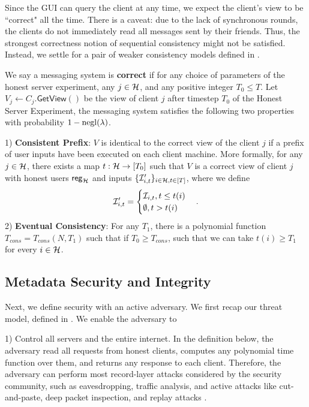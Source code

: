 Since the GUI can query the client at any time, we expect the client's view to be ``correct" all the time. There is a caveat: due to the lack of synchronous rounds, the clients do not immediately read all messages sent by their friends. Thus, the strongest correctness notion of sequential consistency might not be satisfied. Instead, we settle for a pair of weaker consistency models defined in \cite{doug13Consistency}. 
\begin{definition}
\label{defn:messaging-correctness}
 We say a messaging system is \textbf{correct} if for any choice of parameters of the honest server experiment, any $j \in \mathcal{H}$, and any positive integer $T_0 \leq T$. Let $V_j \leftarrow C_j.\mathsf{GetView}()$ be the view of client $j$ after timestep $T_0$ of the Honest Server Experiment, the messaging system satisfies the following two properties with probability $1 - \operatorname{negl}(\lambda)$.

1) \textbf{Consistent Prefix}: $V$ is identical to the correct view of the client $j$ if a prefix of user inputs have been executed on each client machine. More formally, for any $j \in \mathcal{H}$, there exists a map $t: \mathcal{H} \to [T_0]$ such that  $V$ is a correct view of client $j$ with honest users $\mathsf{reg}_{\mathcal{H}}$ and inputs $\{\mathcal{I}'_{i, t}\}_{i \in \mathcal{H}, t \in [T]}$, where we define
$$\mathcal{I}'_{i, t} = \begin{cases}
\mathcal{I}_{i, t}, t \leq t(i) \\
\emptyset, t > t(i)
\end{cases}.$$
2) \textbf{Eventual Consistency}: For any $T_1$, there is a polynomial function $T_{cons} = T_{cons}(N, T_1)$ such that if $T_0 \geq T_{cons}$, such that we can take $t(i) \geq T_1$ for every $i \in \mathcal{H}$.
\end{definition}

\subsection{Metadata Security and Integrity}
\label{subsec:messaging-security-integrity}
Next, we define security with an active adversary. We first recap our threat model, defined in \cite[Section 2.2]{whitepaper}. We enable the adversary to

1) Control all servers and the entire internet. In the definition below, the adversary read all requests from honest clients, computes any polynomial time function over them, and returns any response to each client. Therefore, the adversary can perform most record-layer attacks considered by the security community, such as eavesdropping, traffic analysis, and active attacks like cut-and-paste, deep packet inspection, and replay attacks \cite{DB1996sslsecurity}.

